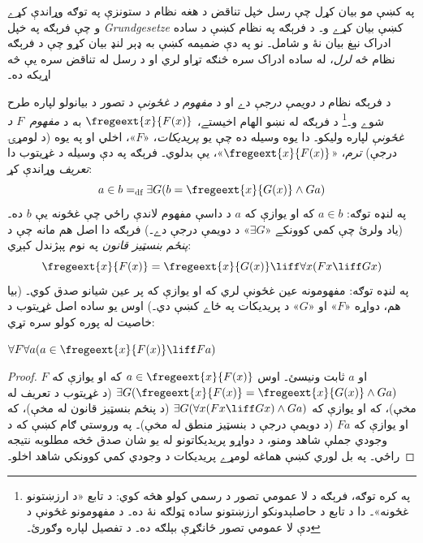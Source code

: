 \documentclass[../../../include/open-logic-section]{subfiles}
\begin{document}


په  کښې مو بيان کړل چې رسل خپل تناقض د هغه
نظام د ستونزې په توګه وړاندې کړے و چې فرېګه په خپل
\emph{Grundgesetze} کښې بيان کړے و۔ د فرېګه په نظام کښې د
ساده ادراک نېغ بيان نۀ و شامل۔ نو په دې ضميمه کښې به ډېر
لنډ بيان کړو چې د فرېګه نظام څه \emph{لرل}، له ساده ادراک
سره څنګه تړاو لري او د رسل له تناقض سره يې څه اړيکه ده۔

د فرېګه نظام \emph{د دويمې درجې} دے او د \emph{مفهوم د
غځونې} د تصور د بيانولو لپاره طرح شوے و۔\footnote{په کره
  توګه، فرېګه د لا عمومي تصور د رسمي کولو هڅه کوي: د تابع
  «د ارزښتونو غځونه»۔ دا د تابع د حاصلېدونکو ارزښتونو ساده
  ټولګه نۀ ده۔ د مفهومونو غځونې د دې لا عمومي تصور
  ځانګړې بېلګه ده۔ د تفصيل لپاره \citet[pp.\ 8--9]{Heck2012}
  وګورئ۔} د فرېګه له نښو الهام اخيستے، $\fregeext{x}{F(x)}$
به د \emph{مفهوم~$F$ د غځونې} لپاره وليکو۔ دا يوه وسيله
ده چې يو \emph{پريديکات}، «$F$»، اخلي او په يوه (د لومړۍ
درجې) \emph{ترم}، «$\fregeext{x}{F(x)}$»، يې بدلوي۔ فرېګه
په دې وسيله د غړيتوب دا \emph{تعريف} وړاندې کړ:
\[
  a \in b =_\text{df} \exists G(b = \fregeext{x}{G(x)} \land Ga)
\]
په لنډه توګه: $a \in b$ که او يوازې که $a$ د داسې مفهوم
لاندې راځي چې غځونه يې $b$ ده۔ (ياد ولرئ چې کمي کوونکے
«$\exists G$» د دويمې درجې دے۔) فرېګه دا اصل هم مانه چې
د \emph{پنځم بنسټيز قانون} په نوم پېژندل کېږي:
$$\fregeext{x}{F(x)} = \fregeext{x}{G(x)} \liff \forall x (Fx \liff Gx)$$
په لنډه توګه: مفهومونه عين غځونې لري که او يوازې که پر عين
شيانو صدق کوي۔ (بيا هم، دواړه «$F$» او «$G$» د پريديکات
په ځاے کښې دي۔) اوس يو ساده اصل غړيتوب د خاصيت له
پوره کولو سره تړي:

\begin{lem}
$\forall F \forall a(a \in \fregeext{x}{F(x)} \liff Fa)$
\end{lem}

\begin{proof} 
$F$ او $a$ ثابت ونيسئ۔ اوس $a \in \fregeext{x}{F(x)}$ که او يوازې که
$\exists G(\fregeext{x}{F(x)}
= \fregeext{x}{G(x)} \land Ga)$ (د غړيتوب د تعريف له مخې)، که او يوازې که
$\exists G(\forall x(Fx \liff Gx) \land Ga)$ (د پنځم بنسټيز قانون له مخې)، که او يوازې که $Fa$
(د دويمې درجې د بنسټيز منطق له مخې)۔ په وروستي ګام کښې
که د وجودي جملې شاهد ومنو، د دواړو پريديکاتونو له يو شان
صدق څخه مطلوبه نتيجه راځي۔ په بل لوري کښې هماغه لومړے
پريديکات د وجودي کمي کوونکي شاهد اخلو۔
\end{proof}
\end{document}
